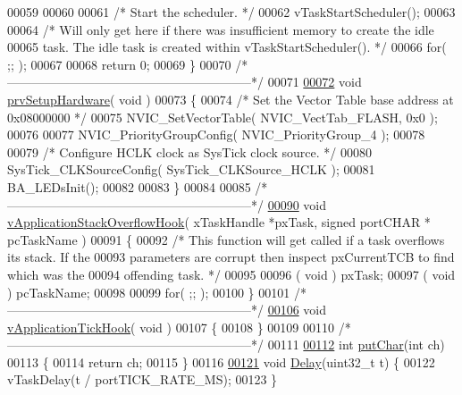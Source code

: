 \begin{DoxyCode}
00059 
00060 
00061     \textcolor{comment}{/* Start the scheduler. */}
00062   vTaskStartScheduler();
00063 
00064     \textcolor{comment}{/* Will only get here if there was insufficient memory to create the idle}
00065 \textcolor{comment}{    task.  The idle task is created within vTaskStartScheduler(). */}
00066   \textcolor{keywordflow}{for}( ;; );
00067 
00068   \textcolor{keywordflow}{return} 0;
00069 \}
00070 \textcolor{comment}{/*-----------------------------------------------------------*/}
00071 
\hypertarget{main_8c_source_l00072}{}\hyperlink{main_8c_a70d35396e40a379083f623fc98817ce5}{00072} \textcolor{keywordtype}{void} \hyperlink{main_8c_a70d35396e40a379083f623fc98817ce5}{prvSetupHardware}( \textcolor{keywordtype}{void} )
00073 \{
00074   \textcolor{comment}{/* Set the Vector Table base address at 0x08000000 */}
00075   NVIC\_SetVectorTable( NVIC\_VectTab\_FLASH, 0x0 );
00076 
00077   NVIC\_PriorityGroupConfig( NVIC\_PriorityGroup\_4 );
00078 
00079   \textcolor{comment}{/* Configure HCLK clock as SysTick clock source. */}
00080   SysTick\_CLKSourceConfig( SysTick\_CLKSource\_HCLK );
00081   BA\_LEDsInit();
00082 
00083 \}
00084 
00085 \textcolor{comment}{/*-----------------------------------------------------------*/}
\hypertarget{main_8c_source_l00090}{}\hyperlink{main_8c_a329de0f973fabef8b34da6444654295c}{00090} \textcolor{keywordtype}{void} \hyperlink{main_8c_a329de0f973fabef8b34da6444654295c}{vApplicationStackOverflowHook}( xTaskHandle *pxTask, \textcolor{keywordtype}{signed} portCHAR *
      pcTaskName )
00091 \{
00092   \textcolor{comment}{/* This function will get called if a task overflows its stack.   If the}
00093 \textcolor{comment}{  parameters are corrupt then inspect pxCurrentTCB to find which was the}
00094 \textcolor{comment}{  offending task. */}
00095 
00096   ( void ) pxTask;
00097   ( void ) pcTaskName;
00098 
00099   \textcolor{keywordflow}{for}( ;; );
00100 \}
00101 \textcolor{comment}{/*-----------------------------------------------------------*/}
\hypertarget{main_8c_source_l00106}{}\hyperlink{main_8c_a9ca051aa77e17583aa5a85d5de5c199a}{00106} \textcolor{keywordtype}{void} \hyperlink{main_8c_a9ca051aa77e17583aa5a85d5de5c199a}{vApplicationTickHook}( \textcolor{keywordtype}{void} )
00107 \{
00108 \}
00109 
00110 \textcolor{comment}{/*-----------------------------------------------------------*/}
00111 
\hypertarget{main_8c_source_l00112}{}\hyperlink{main_8c_aa2bb3bba4ac29312751cdf8d20d86c5b}{00112} \textcolor{keywordtype}{int} \hyperlink{main_8c_aa2bb3bba4ac29312751cdf8d20d86c5b}{putChar}(\textcolor{keywordtype}{int} ch)
00113 \{
00114   \textcolor{keywordflow}{return} ch;
00115 \}
00116 
\hypertarget{main_8c_source_l00121}{}\hyperlink{main_8c_a7d5d5262a3c7d9c39a226ed465e347dc}{00121} \textcolor{keywordtype}{void} \hyperlink{main_8c_a7d5d5262a3c7d9c39a226ed465e347dc}{Delay}(uint32\_t t) \{
00122   vTaskDelay(t / portTICK\_RATE\_MS);
00123 \}
\end{DoxyCode}

